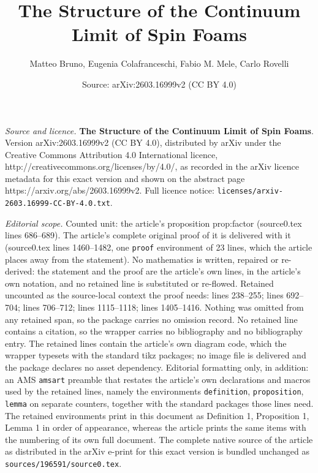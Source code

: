 \documentclass[10pt,a4paper]{amsart}
\title{\textbf{The Structure of the Continuum Limit of Spin Foams}}
\author{Matteo Bruno, Eugenia Colafranceschi, Fabio M. Mele, Carlo Rovelli}
\date{Source: arXiv:2603.16999v2 (CC BY 4.0)}
\begin{document}
\maketitle

\noindent\emph{Source and licence.} \textbf{The Structure of the Continuum Limit of Spin Foams}. Version arXiv:2603.16999v2 (CC BY 4.0), distributed by arXiv under the Creative Commons Attribution 4.0 International licence, http://creativecommons.org/licenses/by/4.0/, as recorded in the arXiv licence metadata for this exact version and shown on the abstract page https://arxiv.org/abs/2603.16999v2. Full licence notice: \texttt{licenses/arxiv-2603.16999-CC-BY-4.0.txt}.\par\smallskip

\noindent\textit{Editorial scope.} Counted unit: the article's proposition prop:factor (source0.tex lines 686--689). The article's complete original proof of it is delivered with it (source0.tex lines 1460--1482, one \texttt{proof} environment of 23 lines, which the article places away from the statement). No mathematics is written, repaired or re-derived: the statement and the proof are the article's own lines, in the article's own notation, and no retained line is substituted or re-flowed.  Retained uncounted as the source-local context the proof needs: lines 238--255; lines 692--704; lines 706--712; lines 1115--1118; lines 1405--1416.  Nothing was omitted from any retained span, so the package carries no omission record.  No retained line contains a citation, so the wrapper carries no bibliography and no bibliography entry.  The retained lines contain the article's own diagram code, which the wrapper typesets with the standard tikz packages; no image file is delivered and the package declares no asset dependency.  Editorial formatting only, in addition: an AMS \texttt{amsart} preamble that restates the article's own declarations and macros used by the retained lines, namely the environments \texttt{definition}, \texttt{proposition}, \texttt{lemma} on separate counters, together with the standard packages those lines need.  The retained environments print in this document as Definition 1, Proposition 1, Lemma 1 in order of appearance, whereas the article prints the same items with the numbering of its own full document.  The complete native source of the article as distributed in the arXiv e-print for this exact version is bundled unchanged as \texttt{sources/196591/source0.tex}.
\end{document}
